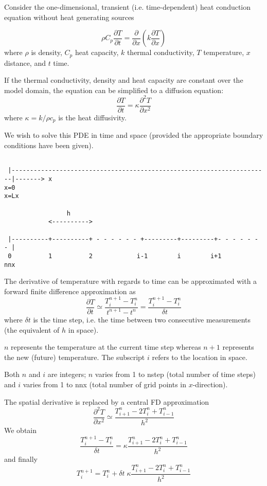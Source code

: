 Consider the one-dimensional, transient (i.e. time-dependent) 
heat conduction equation without heat generating sources

\[
\rho C_p \frac{\partial T}{\partial t} 
= \frac{\partial }{\partial x} \left(  k  \frac{\partial T}{\partial x} \right)
\]
where $\rho$ is density, $C_p$ heat capacity, $k$ thermal conductivity, $T$ temperature, 
$x$ distance, and $t$ time. 

If the thermal conductivity, density and heat capacity are constant over the model domain, 
the equation can be simplified to a diffusion equation:
\[
\frac{\partial T}{\partial t} =  \kappa \frac{\partial^2 T}{\partial x^2} 
\]
where $\kappa=k/\rho c_p$ is the heat diffusivity.

We wish to solve this PDE in time and space (provided the appropriate 
boundary conditions have been given). 

\begin{verbatim}

 |----------------------------------------------------------------------|-------> x
x=0                                                                    x=Lx

                 h
            <---------->
 
 |----------+----------+ - - - - - - +---------+---------+- - - - - - - | 
 0          1          2            i-1        i        i+1            nnx

\end{verbatim}

The derivative of temperature with regards to time can be approximated
with a forward finite difference approximation as
\[
\frac{\partial T}{\partial t} 
\simeq \frac{T_{i}^{n+1}-T_i^n}{t^{n+1}-t^n} 
= \frac{T_{i}^{n+1}-T_i^n}{\delta t} 
\]
where $\delta t$ is the time step, i.e. the time between two consecutive 
measurements (the equivalent of $h$ in space).

$n$ represents the temperature at the current time step whereas $n+1$
represents the new (future) temperature. The subscript $i$ refers to the location in space.

Both $n$ and $i$ are integers; $n$ varies from 1 to nstep (total number of time steps)
and $i$ varies from 1 to nnx (total number of grid points in $x$-direction).

The spatial derivative is replaced by a central FD approximation
\[
\frac{\partial^2 T}{\partial x^2} 
\simeq \frac{T_{i+1}^n - 2T_i^n + T_{i-1}^n}{h^2}
\]
We obtain
\[
\frac{T_{i}^{n+1}-T_i^n}{\delta t} 
= \kappa \frac{T_{i+1}^n - 2T_i^n + T_{i-1}^n}{h^2}
\]
and finally
\[
T_i^{n+1}=T_i^n + \delta t \; \kappa \frac{T_{i+1}^n - 2T_i^n + T_{i-1}^n}{h^2}
\]

